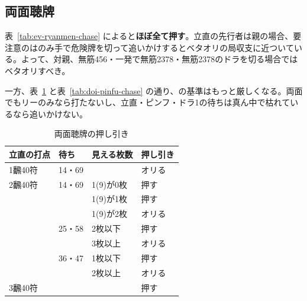 \documentclass[../nankiru_main.tex]{subfiles}
\begin{document}
\subsection{両面聴牌}

表~\ref{tab:ev-ryanmen-chase} によると\textbf{ほぼ全て押す}\citep[][pp. 90--91]{miinin-stat}。立直の先行者は親の場合、要注意のはのみ手で危険牌を切って追いかけするとベタオリの局収支に近ついている。よって、対親、無筋456・一発で無筋2378・無筋2378のドラを切る場合ではベタオリすべき\citep[][p. 90]{miinin-stat}。

一方、表~\ref{tab:doi-ryanmen-chase} と表~\ref{tab:doi-pinfu-chase} の通り、\citet{doi}の基準はもっと厳しくなる。両面でもリーのみなら打たないし、立直・ピンフ・ドラ1の待ちは真ん中で枯れているなら追いかけない。

\begin{table}[h]
  \centering
  \begin{tabular}{llll}
    立直の打点 & 待ち & 見える枚数 & 押し引き \\
    \hline
    1飜40符 & 14・69 &     & オリる \\
    2飜40符 & 14・69 & 1(9)が0枚 & 押す \\
           &        & 1(9)が1枚 & 押す \\
           &        & 1(9)が2枚 & オリる \\
           & 25・58 & 2枚以下 & 押す \\
           &        & 3枚以上 & オリる \\
           & 36・47 & 1枚以下 & 押す \\
           &        & 2枚以上 & オリる \\
    3飜40符 &        &    & 押す
  \end{tabular}
  \caption{両面聴牌の押し引き\citep[][p.~28--29]{doi}}
  \label{tab:doi-ryanmen-chase}
\end{table}
\end{document}
